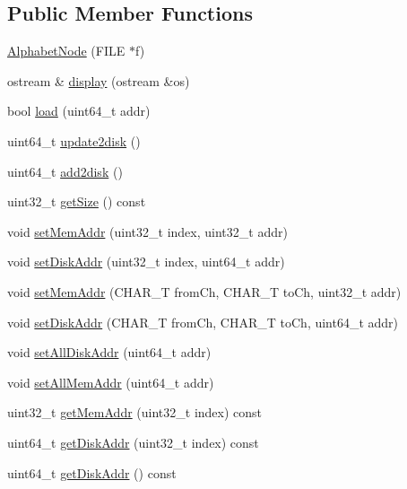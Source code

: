\subsection*{Public Member Functions}
\begin{CompactItemize}
\item 
\hyperlink{classAlphabetNode_aa35cf0cfb203b660441bb1ce783b2d0}{AlphabetNode} (FILE $\ast$f)
\item 
ostream \& \hyperlink{classAlphabetNode_474bbf96a8cc0bb25337340628d18e94}{display} (ostream \&os)
\item 
bool \hyperlink{classAlphabetNode_9ddd0b5d2cf28d758dcac0d1b0e0d297}{load} (uint64\_\-t addr)
\item 
uint64\_\-t \hyperlink{classAlphabetNode_fe2a92cfc98d149ef34b04bfa7bd0ac3}{update2disk} ()
\item 
uint64\_\-t \hyperlink{classAlphabetNode_4d663c0c287bf1a5144272815c4f3486}{add2disk} ()
\item 
uint32\_\-t \hyperlink{classAlphabetNode_87e35e0c031ef4ce3d007fcc97c74105}{getSize} () const 
\item 
void \hyperlink{classAlphabetNode_4e025529d12350e14d67452a26ede7ef}{setMemAddr} (uint32\_\-t index, uint32\_\-t addr)
\item 
void \hyperlink{classAlphabetNode_7a3a05fb25fc9ca8a39585d0528dbb7a}{setDiskAddr} (uint32\_\-t index, uint64\_\-t addr)
\item 
void \hyperlink{classAlphabetNode_df603448459185094253e572d805bf94}{setMemAddr} (CHAR\_\-T fromCh, CHAR\_\-T toCh, uint32\_\-t addr)
\item 
void \hyperlink{classAlphabetNode_cfbfa5139224c875c82d352e0661822a}{setDiskAddr} (CHAR\_\-T fromCh, CHAR\_\-T toCh, uint64\_\-t addr)
\item 
void \hyperlink{classAlphabetNode_2fddf599d2d1f4f186a42436832cb428}{setAllDiskAddr} (uint64\_\-t addr)
\item 
void \hyperlink{classAlphabetNode_bc6a84a232a8f7aef8773c9c24fa458c}{setAllMemAddr} (uint64\_\-t addr)
\item 
uint32\_\-t \hyperlink{classAlphabetNode_c43596bdd6a74609449bce2b795f4c7c}{getMemAddr} (uint32\_\-t index) const 
\item 
uint64\_\-t \hyperlink{classAlphabetNode_271f004c2a74d883b663b425ef6e960b}{getDiskAddr} (uint32\_\-t index) const 
\item 
uint64\_\-t \hyperlink{classAlphabetNode_000a733fadb9bfebe02fb8d969d6e460}{getDiskAddr} () const 
\end{CompactItemize}
